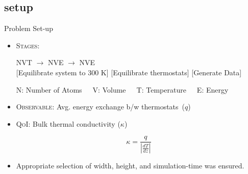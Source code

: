 \documentclass[xcolor={x11names,table},compress,svgnames,mathserif]{beamer}
\renewcommand{\(}{\begin{columns}}
\renewcommand{\)}{\end{columns}}
\newcommand{\<}[1]{\begin{column}{#1}}
\renewcommand{\>}{\end{column}}
\newcommand*\myitem{%
  \item[\color{DeepSkyBlue4}\scalebox{0.6}{\ding{110}}]}
\newcommand{\be}{\begin{equation}}
\newcommand{\ee}{\end{equation}}
\begin{document}
\subsection{setup}
\begin{frame}{Problem Set-up}


\begin{itemize}
\myitem \textsc{Stages}:\\

\begin{center}
{\color{green}NVT} \hspace{5mm} $\rightarrow$ \hspace{5mm} {\color{cyan}NVE} \hspace{5mm}
$\rightarrow$ \hspace{5mm} {\color{magenta}NVE}
\\ \vspace{1mm}
\tiny \hspace{-5mm}[Equilibrate system to 300 K] \hspace{1mm} [Equilibrate thermostats] \hspace{4mm}
 [Generate Data]
\\ \vspace{1mm}

\tiny{N: Number of Atoms~~~V: Volume~~~T: Temperature~~~E: Energy}
\end{center}

\normalsize

\myitem \textsc{Observable}: Avg. energy exchange b/w thermostats~($q$)
\vspace{2mm}

\myitem \textsc{QoI}: Bulk thermal conductivity ($\kappa$)

\begin{center}
\begin{tcolorbox}[width=0.3\textwidth,height=0.2\textwidth,colback=DeepSkyBlue!20,notitle,colframe=DeepSkyBlue!20,colupper=DeepSkyBlue4]
\vspace{-2mm}
\be
\kappa = \frac{q}{\left|\frac{dT}{dz}\right|} \nonumber
\ee
\end{tcolorbox}
\end{center}


\vspace{2mm}

\myitem Appropriate selection of {\color{pigment}width}, 
{\color{pigment}height}, and {\color{pigment}simulation-time} was ensured.  
\end{itemize}

\end{frame}
\end{document}
